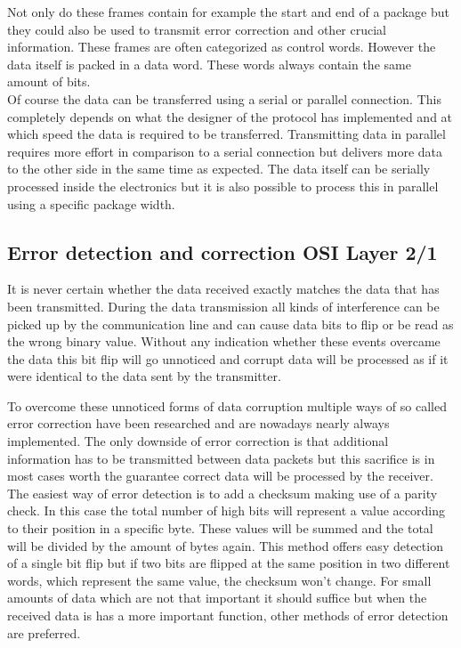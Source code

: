 Not only do these frames contain for example the start and end of a package but they could also be used to transmit error correction and other crucial information. These frames are often categorized as control words. However the data itself is packed in a data word. These words always contain the same amount of bits. \cite{InterlakenProtocol} \\

Of course the data can be transferred using a serial or parallel connection. This completely depends on what the designer of the protocol has implemented and at which speed the data is required to be transferred. Transmitting data in parallel requires more effort in comparison to a serial connection but delivers more data to the other side in the same time as expected. The data itself can be serially processed inside the electronics but it is also possible to process this in parallel using a specific package width. 

\subsection[Error detection and correction]{Error detection and correction \hfill OSI Layer 2/1}
It is never certain whether the data received exactly matches the data that has been transmitted. During the data transmission all kinds of interference can be picked up by the communication line and can cause data bits to flip or be read as the wrong binary value. Without any indication whether these events overcame the data this bit flip will go unnoticed and corrupt data will be processed as if it were identical to the data sent by the transmitter.

To overcome these unnoticed forms of data corruption multiple ways of so called error correction have been researched and are nowadays nearly always implemented. The only downside of error correction is that additional information has to be transmitted between data packets but this sacrifice is in most cases worth the guarantee correct data will be processed by the receiver.\\

The easiest way of error detection is to add a checksum making use of a parity check. In this case the total number of high bits will represent a value according to their position in a specific byte. These values will be summed and the total will be divided by the amount of bytes again. This method offers easy detection of a single bit flip but if two bits are flipped at the same position in two different words, which represent the same value, the checksum won't change. For small amounts of data which are not that important it should suffice but when the received data is has a more important function, other methods of error detection are preferred.\\

